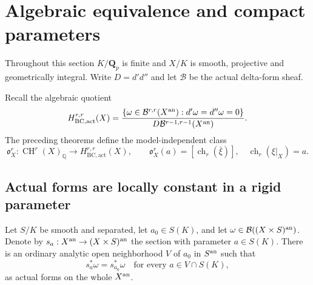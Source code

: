 \section{Algebraic equivalence and compact parameters}
\label{r12p:section}

Throughout this section $K/\mathbf Q_p$ is finite and $X/K$ is smooth,
projective and geometrically integral.  Write $D=d'd''$ and let
$\mathcal B$ be the actual delta-form sheaf.

Recall the algebraic quotient
\[
 H_{\mathrm{BC,act}}^{r,r}(X)=
 \frac{\{\omega\in\mathcal B^{r,r}(X^{\rm an}):
                    d'\omega=d''\omega=0\}}
      {D\mathcal B^{r-1,r-1}(X^{\rm an})}.
\]
The preceding theorems define the model-independent class
\[
 \mathfrak o_X^r:\operatorname{CH}^r(X)_{\mathbb Q}
       \longrightarrow H_{\mathrm{BC,act}}^{r,r}(X),
 \qquad
 \mathfrak o_X^r(a)=[\operatorname{ch}_r(\bar\xi)],
 \quad \operatorname{ch}_r(\xi|_X)=a.
\tag{R12.P1}\label{r12p:obstruction}
\]


\subsection{Actual forms are locally constant in a rigid parameter}

\begin{lemma}
\label{r12p:rigid-fiber}
Let $S/K$ be smooth and separated, let $a_0\in S(K)$, and let
$\omega\in\mathcal B((X\times S)^{\rm an})$.  Denote by
$s_a:X^{\rm an}\to(X\times S)^{\rm an}$ the section with parameter
$a\in S(K)$.  There is an ordinary analytic open neighborhood $V$ of
$a_0$ in $S^{\rm an}$ such that
\[
                    s_a^*\omega=s_{a_0}^*\omega
       \quad\text{for every }a\in V\cap S(K),
\tag{R12.P2}\label{r12p:literal-constancy}
\]
as actual forms on the whole $X^{\rm an}$.
\end{lemma}

